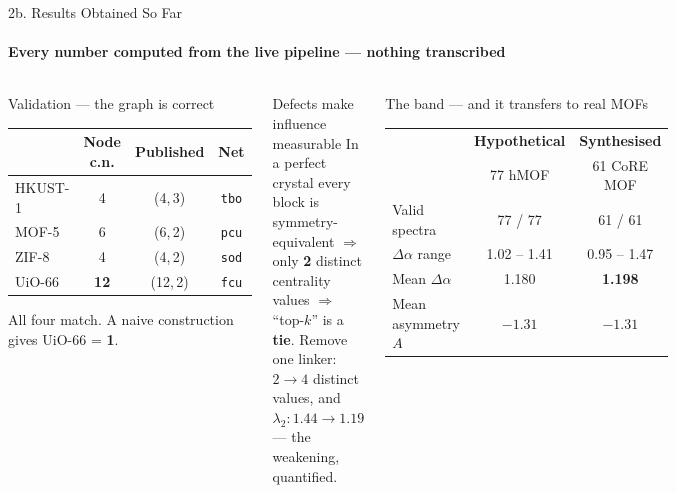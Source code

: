 \documentclass[aspectratio=169, 11pt]{beamer}
\begin{document}
\begin{frame}{2b. Results Obtained So Far}
\framesubtitle{Every number computed from the live pipeline --- nothing transcribed}
\begin{columns}[T]
\begin{block}{\footnotesize Validation --- the graph is correct}
{\scriptsize
\begin{tabular}{@{}lccc@{}}
\toprule
& \textbf{Node c.n.} & \textbf{Published} & \textbf{Net} \\
\midrule
HKUST-1 & 4 & (4,\,3) & \texttt{tbo} \\
MOF-5 & 6 & (6,\,2) & \texttt{pcu} \\
ZIF-8 & 4 & (4,\,2) & \texttt{sod} \\
UiO-66 & \textbf{12} & (12,\,2) & \texttt{fcu} \\
\bottomrule
\end{tabular}
\vspace{0.1cm}

All four match. A naive construction gives UiO-66 = \textbf{1}.}
\end{block}

\begin{block}{\footnotesize Defects make influence measurable}
{\scriptsize
In a perfect crystal every block is symmetry-equivalent $\Rightarrow$ only \textbf{2}
distinct centrality values $\Rightarrow$ ``top-$k$'' is a \textbf{tie}.
Remove one linker: $2 \to 4$ distinct values, and
$\lambda_2: 1.44 \to 1.19$ --- the weakening, quantified.}
\end{block}

\begin{block}{\footnotesize The band --- and it transfers to real MOFs}
{\scriptsize
\begin{tabular}{@{}lcc@{}}
\toprule
& \textbf{Hypothetical} & \textbf{Synthesised} \\
& 77 hMOF & 61 CoRE MOF \\
\midrule
Valid spectra & 77 / 77 & 61 / 61 \\
$\Delta\alpha$ range & 1.02 -- 1.41 & 0.95 -- 1.47 \\
Mean $\Delta\alpha$ & 1.180 & \textbf{1.198} \\
Mean asymmetry $A$ & $-1.31$ & \textbf{$-1.31$} \\
\bottomrule
\end{tabular}
\vspace{0.1cm}

}
\end{block}
\end{columns}
\end{frame}
\end{document}
